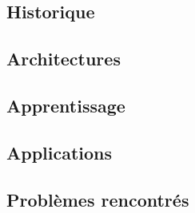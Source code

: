 \subsection{Historique}


\subsection{Architectures}


\subsection{Apprentissage}


\subsection{Applications}


\subsection{Problèmes rencontrés}


